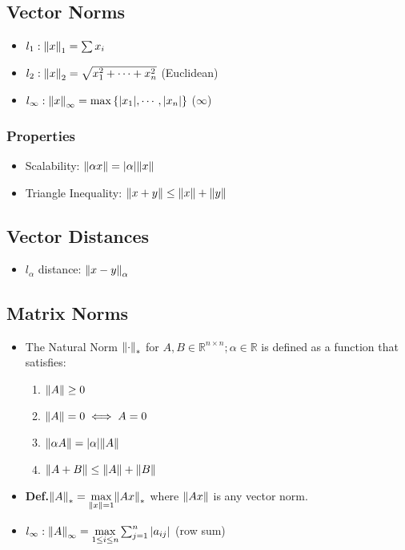 \documentclass[9pt, letterpaper]{extarticle}
\newcommand{\defn}{\textbf{Def.}\xspace}
\begin{document}
\begin{multicols*}{3}
  \subsection{Vector Norms}
  \begin{itemize}
    \item $l_1 : \norm{x}_1 = \sum x_i$
    \item $l_2 : \norm{x}_2 = \sqrt{x_1^2 + \dotsb + x_n^2}$ (Euclidean)
    \item $l_\infty : \norm{x}_\infty = \max{\{|x_1|, \dotsb, |x_n|\}}$
      ($\infty$) 
  \end{itemize}

  \subsubsection{Properties}
  \begin{itemize}
    \item Scalability: $\norm{\alpha x} = \abs{\alpha} \norm{x}$
    \item Triangle Inequality: $\norm{x+y} \leq \norm{x} + \norm{y}$
  \end{itemize}

  \subsection{Vector Distances}
  \begin{itemize}
    \item $l_\alpha$ distance: $\norm{x-y}_\alpha$
  \end{itemize}

  \subsection{Matrix Norms}
  \begin{itemize}
    \item The Natural Norm $\norm{\cdot}_*$ for $A, B \in \mathbb{R}^{n \times n};
      \alpha \in \mathbb{R}$ is defined as a function that satisfies:
      \begin{enumerate}
        \item $\norm{A} \geq 0$
        \item $\norm{A} = 0 \iff A = 0$
        \item $\norm{\alpha A} = \abs{\alpha} \norm{A}$
        \item $\norm{A + B} \leq \norm{A} + \norm{B}$
      \end{enumerate}
    \item \defn $\norm{A}_* = \underset{\|x\| = 1}{\max} \norm{Ax}_*$ where
      $\norm{Ax}$ is any vector norm.
    \item $l_\infty : \norm{A}_\infty = \underset{1 \leq i \leq n}{\max}
      \sum_{j=1}^{n} \abs{a_{ij}}$ (row sum)
  \end{itemize}

\end{multicols*}
\end{document}
